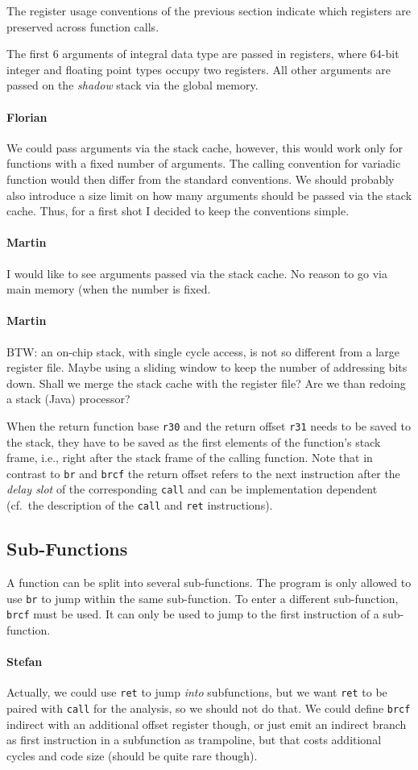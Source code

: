 \documentclass{IEEEtran}
\newcommand{\comment}[3]{\paragraph*{\textbf{#1}}{\color{#3}#2}}
\newcommand{\martin}[1]{\comment{Martin}{#1}{Blue}}
\newcommand{\stefan}[1]{\comment{Stefan}{#1}{RoyalPurple}}
\newcommand{\fb}[1]{\comment{Florian}{#1}{Emerald}}
\begin{document}
The register usage conventions of the previous section indicate which registers
are preserved across function calls.

The first $6$ arguments of integral data type are passed in registers, where
64-bit integer and floating point types occupy two registers. All other
arguments are passed on the \emph{shadow} stack via the global memory.

\fb{We could pass arguments via the stack cache, however, this would work only
for functions with a fixed number of arguments. The calling convention for
variadic function would then differ from the standard conventions. We should
probably also introduce a size limit on how many arguments should be passed via
the stack cache. Thus, for a first shot I decided to keep the conventions
simple.}
\martin{I would like to see arguments passed via the stack cache. No
reason to go via main memory (when the number is fixed.}

\martin{BTW: an on-chip stack, with single cycle access, is not so different from
a large register file. Maybe using a sliding window to keep the number of
addressing bits down. Shall we merge the stack cache with the register file?
Are we than redoing a stack (Java) processor?}

When the return function base \texttt{r30} and the return offset \texttt{r31}
needs to be saved to the stack, they have to be saved as the first elements
of the function's stack frame, i.e., right after the stack frame of the
calling function. Note that in contrast to \texttt{br} and \texttt{brcf} the 
return offset refers to the next instruction after the \emph{delay slot} of the 
corresponding \texttt{call} and can be implementation dependent (cf.\ the description
of the \texttt{call} and \texttt{ret} instructions).

\subsection{Sub-Functions} 
A function can be split into several sub-functions. The program is only allowed to use
\texttt{br} to jump within the same sub-function. To enter a different sub-function,
\texttt{brcf} must be used. It can only be used to jump to the first instruction of a 
sub-function.

\stefan{Actually, we could use \texttt{ret} to jump \emph{into} subfunctions,
but we want \texttt{ret} to be paired with \texttt{call} for the analysis, so
we should not do that. We could define \texttt{brcf} indirect with an additional
offset register though, or just emit an indirect branch as first instruction in a
subfunction as trampoline, but that costs additional cycles and code size (should be quite rare though).}
\end{document}
